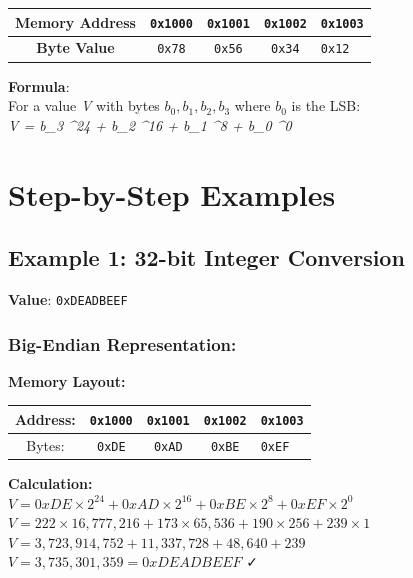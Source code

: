 \documentclass[11pt,a4paper]{article}
\newcommand{\hex}[1]{\texttt{0x#1}}
\newcommand{\byte}[1]{\texttt{#1}}
\newcommand{\address}[1]{\texttt{#1}}
\newcommand{\mathvar}[1]{\textit{#1}}
\begin{document}
\begin{center}
\begin{tabular}{|c|c|c|c|}
\hline
\textbf{Memory Address} & \address{0x1000} & \address{0x1001} & \address{0x1002} & \address{0x1003} \\
\hline
\textbf{Byte Value} & \byte{0x78} & \byte{0x56} & \byte{0x34} & \byte{0x12} \\
\hline
\end{tabular}
\end{center}

\begin{center}
\textbf{Formula}:\\
For a value \mathvar{V} with bytes \mathvar{$b_0, b_1, b_2, b_3$} where \mathvar{$b_0$} is the LSB:\\
\mathvar{V = b_3 ^{24} + b_2 \times 2^{16} + b_1 \times 2^8 + b_0 \times 2^0}
\end{center}

\section{Step-by-Step Examples}

\subsection{Example 1: 32-bit Integer Conversion}

\textbf{Value}: \hex{DEADBEEF}

\subsubsection{Big-Endian Representation:}

\begin{examplebox}
\textbf{Memory Layout:}\\
\begin{tabular}{|c|c|c|c|}
\hline
Address: & \address{0x1000} & \address{0x1001} & \address{0x1002} & \address{0x1003} \\
\hline
Bytes: & \byte{0xDE} & \byte{0xAD} & \byte{0xBE} & \byte{0xEF} \\
\hline
\end{tabular}

\textbf{Calculation:}\\
$V = 0xDE \times 2^{24} + 0xAD \times 2^{16} + 0xBE \times 2^8 + 0xEF \times 2^0$\\
$V = 222 \times 16,777,216 + 173 \times 65,536 + 190 \times 256 + 239 \times 1$\\
$V = 3,723,914,752 + 11,337,728 + 48,640 + 239$\\
$V = 3,735,301,359 = 0xDEADBEEF$ ✓
\end{examplebox}
\end{document}
